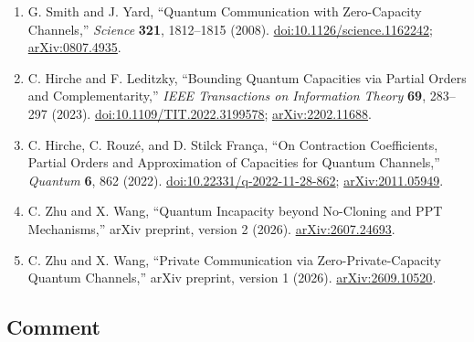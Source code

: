 \begin{enumerate}[label={},leftmargin=4.8em,labelsep=0.5em]
  \footnotesize
  \item[\textup{[SY08]}]\label{ref:c457-smith-yard}
  G. Smith and J. Yard, ``Quantum Communication with Zero-Capacity Channels,'' \emph{Science} \textbf{321}, 1812--1815 (2008). \href{https://doi.org/10.1126/science.1162242}{doi:10.1126/science.1162242}; \href{https://arxiv.org/abs/0807.4935}{arXiv:0807.4935}.

  \item[\textup{[HL23]}]\label{ref:c457-hirche-leditzky}
  C. Hirche and F. Leditzky, ``Bounding Quantum Capacities via Partial Orders and Complementarity,'' \emph{IEEE Transactions on Information Theory} \textbf{69}, 283--297 (2023). \href{https://doi.org/10.1109/TIT.2022.3199578}{doi:10.1109/TIT.2022.3199578}; \href{https://arxiv.org/abs/2202.11688}{arXiv:2202.11688}.

  \item[\textup{[HRS22]}]\label{ref:c457-hirche-rouze-franca}
  C. Hirche, C. Rouz\'e, and D. Stilck Fran\c{c}a, ``On Contraction Coefficients, Partial Orders and Approximation of Capacities for Quantum Channels,'' \emph{Quantum} \textbf{6}, 862 (2022). \href{https://doi.org/10.22331/q-2022-11-28-862}{doi:10.22331/q-2022-11-28-862}; \href{https://arxiv.org/abs/2011.05949}{arXiv:2011.05949}.

  \item[\textup{[ZW26a]}]\label{ref:c457-zhu-wang-qutrit}
  C. Zhu and X. Wang, ``Quantum Incapacity beyond No-Cloning and PPT Mechanisms,'' arXiv preprint, version 2 (2026). \href{https://arxiv.org/abs/2607.24693}{arXiv:2607.24693}.

  \item[\textup{[ZW26b]}]\label{ref:c457-zhu-wang-private}
  C. Zhu and X. Wang, ``Private Communication via Zero-Private-Capacity Quantum Channels,'' arXiv preprint, version 1 (2026). \href{https://arxiv.org/abs/2609.10520}{arXiv:2609.10520}.
\end{enumerate}

\subsection*{Comment}

